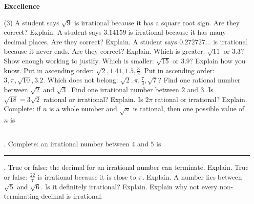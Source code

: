 \documentclass[17pt,a4paper,landscape]{extarticle}
\begin{document}
\sffamily
\boldmath

\boldmath

{\LARGE \textbf{Excellence}}
\begin{tasks}(3)
\task A student says \mbox{$\sqrt{9}$} is irrational because it has a square root sign. Are they correct? Explain.
\task A student says \mbox{$3.14159$} is irrational because it has many decimal places. Are they correct? Explain.
\task A student says \mbox{$0.272727\ldots$} is irrational because it never ends. Are they correct? Explain.
\task Which is greater: \mbox{$\sqrt{11}$} or \mbox{$3.3$}? Show enough working to justify.
\task Which is smaller: \mbox{$\sqrt{15}$} or \mbox{$3.9$}? Explain how you know.
\task Put in ascending order: \mbox{$\sqrt{2}, 1.41, 1.5, \frac{3}{2}$}.
\task Put in ascending order: \mbox{$3, \pi, \sqrt{10}, 3.2$}.
\task Which does not belong: \mbox{$\sqrt{2}, \pi, \frac{7}{3}, \sqrt{7}$}?
\task Find one rational number between \mbox{$\sqrt{2}$} and \mbox{$\sqrt{3}$}.
\task Find one irrational number between \mbox{$2$} and \mbox{$3$}.
\task Is \mbox{$\sqrt{18}=3\sqrt{2}$} rational or irrational? Explain.
\task Is \mbox{$2\pi$} rational or irrational? Explain.
\task Complete: if \mbox{$n$} is a whole number and \mbox{$\sqrt{n}$} is rational, then one possible value of \mbox{$n$} is \rule{1.6cm}{0.15mm}.
\task Complete: an irrational number between \mbox{$4$} and \mbox{$5$} is \rule{1.8cm}{0.15mm}.
\task True or false: the decimal for an irrational number can terminate. Explain.
\task True or false: \mbox{$\frac{22}{7}$} is irrational because it is close to \mbox{$\pi$}. Explain.
\task A number lies between \mbox{$\sqrt{5}$} and \mbox{$\sqrt{6}$}. Is it definitely irrational? Explain.
\task Explain why not every non-terminating decimal is irrational.
\end{tasks}
\end{document}
